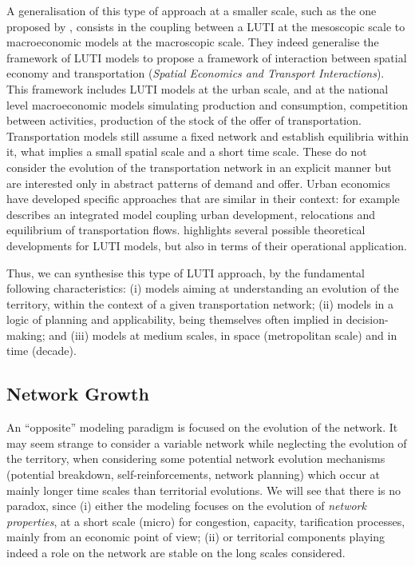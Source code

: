 \documentclass[10pt]{article}
\begin{document}
A generalisation of this type of approach at a smaller scale, such as the one proposed by \cite{russo2012unifying}, consists in the coupling between a LUTI at the mesoscopic scale to macroeconomic models at the macroscopic scale. They indeed generalise the framework of LUTI models to propose a framework of interaction between spatial economy and transportation (\emph{Spatial Economics and Transport Interactions}). This framework includes LUTI models at the urban scale, and at the national level macroeconomic models simulating production and consumption, competition between activities, production of the stock of the offer of transportation. Transportation models still assume a fixed network and establish equilibria within it, what implies a small spatial scale and a short time scale. These do not consider the evolution of the transportation network in an explicit manner but are interested only in abstract patterns of demand and offer. Urban economics have developed specific approaches that are similar in their context: \cite{masso2000} for example describes an integrated model coupling urban development, relocations and equilibrium of transportation flows. \cite{wilson1998land} highlights several possible theoretical developments for LUTI models, but also in terms of their operational application.

Thus, we can synthesise this type of LUTI approach, by the fundamental following characteristics: (i) models aiming at understanding an evolution of the territory, within the context of a given transportation network; (ii) models in a logic of planning and applicability, being themselves often implied in decision-making; and (iii) models at medium scales, in space (metropolitan scale) and in time (decade).


\subsection{Network Growth}

An ``opposite'' modeling paradigm is focused on the evolution of the network. It may seem strange to consider a variable network while neglecting the evolution of the territory, when considering some potential network evolution mechanisms (potential breakdown, self-reinforcements, network planning) which occur at mainly longer time scales than territorial evolutions. We will see that there is no paradox, since (i) either the modeling focuses on the evolution of \emph{network properties}, at a short scale (micro) for congestion, capacity, tarification processes, mainly from an economic point of view; (ii) or territorial components playing indeed a role on the network are stable on the long scales considered.
\end{document}
